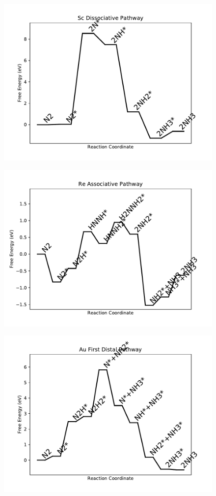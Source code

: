 \begin{figure}
\includegraphics[width=0.8\linewidth]{data/plots/Sc_dissociative.pdf}
\end{figure}

\begin{figure}
\includegraphics[width=0.8\linewidth]{data/plots/Re_associative.pdf}
\end{figure}

\begin{figure}
\includegraphics[width=0.8\linewidth]{data/plots/Au_distal_1.pdf}
\end{figure}

